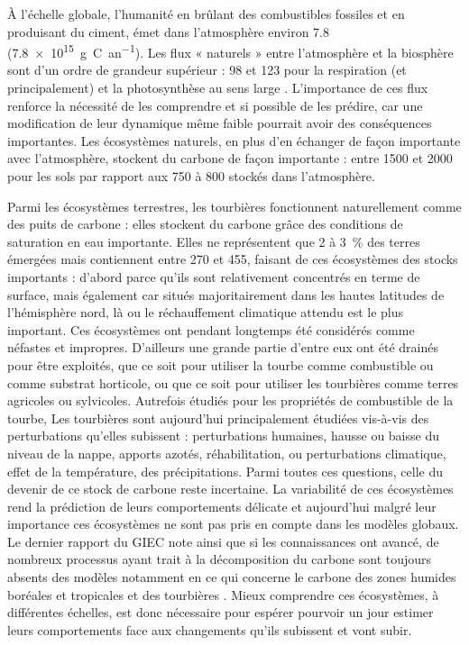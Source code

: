 À l'échelle globale, l'humanité en brûlant des combustibles fossiles et en produisant du ciment, émet dans l'atmosphère environ \SI{7.8}{\pgca} (\SI{7.8e15}{\gram C an^{-1}})\citep{Ciais2014}.
Les flux « naturels » entre l'atmosphère et la biosphère sont d'un ordre de grandeur supérieur : \num{98} et \SI{123}{\pgca} pour la respiration (\coo et \chh principalement) et la photosynthèse au sens large \citep{Bond-Lamberty2010,Beer2010}. L'importance de ces flux renforce la nécessité de les comprendre et si possible de les prédire, car une modification de leur dynamique même faible pourrait avoir des conséquences importantes.
Les écosystèmes naturels, en plus d'en échanger de façon importante avec l'atmosphère, stockent du carbone de façon importante : entre \num{1500} et \SI{2000}{\pgc} pour les sols par rapport aux \num{750} à \SI{800}{\pgc} stockés dans l'atmosphère.

Parmi les écosystèmes terrestres, les tourbières fonctionnent naturellement comme des puits de carbone : elles stockent du carbone grâce des conditions de saturation en eau importante.
Elles ne représentent que \num{2} à \SI{3}{\percent} des terres émergées mais contiennent entre \num{270} et \SI{455}{\pgc}, faisant de ces écosystèmes des stocks importants \citep{gorham1991,turunen2002} :
d'abord parce qu'ils sont relativement concentrés en terme de surface, mais également car situés majoritairement dans les hautes latitudes de l'hémisphère nord, là ou le réchauffement climatique attendu est le plus important.
Ces écosystèmes ont pendant longtemps été considérés comme néfastes et impropres.
D'ailleurs une grande partie d'entre eux ont été drainés pour être exploités, que ce soit pour utiliser la tourbe comme combustible ou comme substrat horticole, ou que ce soit pour utiliser les tourbières comme terres agricoles ou sylvicoles.
Autrefois étudiés pour les propriétés de combustible de la tourbe, Les tourbières sont aujourd'hui principalement étudiées vis-à-vis des perturbations qu'elles subissent : perturbations humaines, hausse ou baisse du niveau de la nappe, apports azotés, réhabilitation, ou perturbations climatique, effet de la température, des précipitations.
Parmi toutes ces questions, celle du devenir de ce stock de carbone reste incertaine.
La variabilité de ces écosystèmes rend la prédiction de leurs comportements délicate et aujourd'hui malgré leur importance ces écosystèmes ne sont pas pris en compte dans les modèles globaux.
Le dernier rapport du GIEC note ainsi que si les connaissances ont avancé, de nombreux processus ayant trait à la décomposition du carbone sont toujours absents des modèles notamment en ce qui concerne le carbone des zones humides boréales et tropicales et des tourbières \citep{Ciais2014}.
Mieux comprendre ces écosystèmes, à différentes échelles, est donc nécessaire pour espérer pourvoir un jour estimer leurs comportements face aux changements qu'ils subissent et vont subir.

